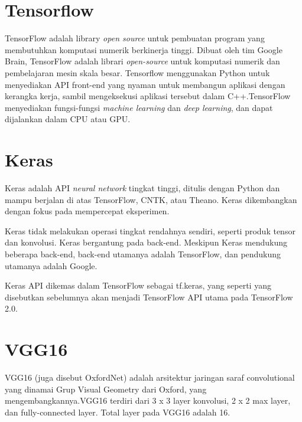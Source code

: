 \section{Tensorflow}
\par TensorFlow adalah library \textit{open source} untuk pembuatan program yang membutuhkan komputasi numerik berkinerja tinggi. Dibuat oleh tim Google Brain, TensorFlow adalah librari \textit{open-source} untuk komputasi numerik dan pembelajaran mesin skala besar. Tensorflow menggunakan Python untuk menyediakan API front-end yang nyaman untuk membangun aplikasi dengan kerangka kerja, sambil mengeksekusi aplikasi tersebut dalam C++.TensorFlow menyediakan fungsi-fungsi \textit{machine learning} dan \textit{deep learning}, dan dapat dijalankan dalam CPU atau GPU\cite{tensorflow_def}.

\section{Keras}
\par Keras adalah API \textit{neural network} tingkat tinggi, ditulis dengan Python dan mampu berjalan di atas TensorFlow, CNTK, atau Theano. Keras dikembangkan dengan fokus pada mempercepat eksperimen\cite{keras_def}.
\par Keras tidak melakukan operasi tingkat rendahnya sendiri, seperti produk tensor dan konvolusi. Keras bergantung pada back-end. Meskipun Keras mendukung beberapa back-end, back-end utamanya adalah TensorFlow, dan pendukung utamanya adalah Google. 
\par Keras API dikemas dalam TensorFlow sebagai tf.keras, yang seperti yang disebutkan sebelumnya akan menjadi TensorFlow API utama pada TensorFlow 2.0.

\section{VGG16}
\par VGG16 (juga disebut OxfordNet) adalah arsitektur jaringan saraf convolutional yang dinamai Grup Visual Geometry dari Oxford, yang mengembangkannya.VGG16 terdiri dari 3 x 3 layer konvolusi, 2 x 2 max layer, dan fully-connected layer. Total layer pada VGG16 adalah 16\cite{vgg16_def}.

